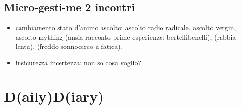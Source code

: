\subsection{Micro-gesti-me 2 incontri}

\begin{itemize}

\item cambiamento stato d'animo ascolto: ascolto radio radicale, ascolto vergin, ascolto mything (ansia racconto prime esperienze: bertellibenelli), (rabbia-lenta), (freddo sonnocerco a-fatica).

\item {} insicurezza incertezza: non so cosa voglio?

\end{itemize}


\section{D(aily)D(iary)}

